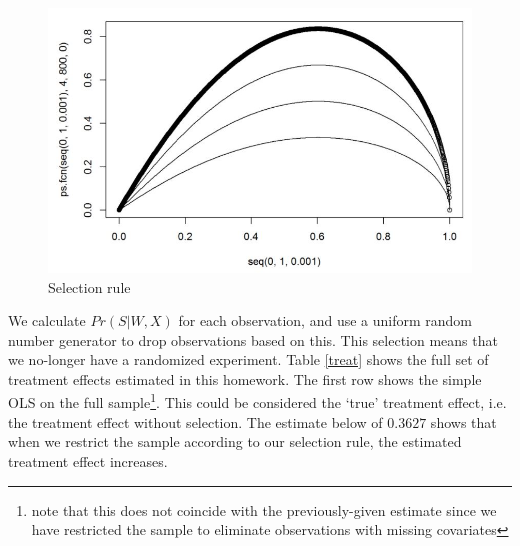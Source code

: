 \documentclass[paper=letter, fontsize=11pt]{scrartcl} %
\begin{document}
\begin{figure}[!ht]
\center
\caption{Selection rule  \label{select}}
\includegraphics[scale=0.8]{figs/select_shape.jpg}
\end{figure}

We calculate $Pr(S|W,X)$ for each observation, and use a uniform random number generator to drop observations based on this. This selection means that we no-longer have a randomized experiment. Table \ref{treat} shows the full set of treatment effects estimated in this homework. The first row shows the simple OLS on the full sample\footnote{note that this does not coincide with the previously-given estimate since we have restricted the sample to eliminate observations with missing covariates}. This could be considered the `true' treatment effect, i.e. the treatment effect without selection. The estimate below of $0.3627$ shows that when we restrict the sample according to our selection rule, the estimated treatment effect increases.
\end{document}
